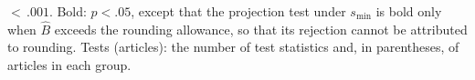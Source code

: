 \begin{table}[t]
\begin{threeparttable}
\begin{tablenotes}[flushleft]
${<}\,.001$. Bold: $p<.05$, except that the projection test under $s_{\min}$ is bold only when $\widehat{B}$ exceeds the rounding allowance, so that its rejection cannot be attributed to rounding. Tests (articles): the number of test statistics and, in parentheses, of articles in each group.
\end{tablenotes}
\end{threeparttable}
\end{table}

